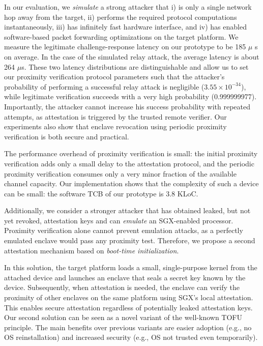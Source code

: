 In our evaluation, we \emph{simulate} a strong attacker that i) is only a single network hop away from the target, ii) performs the required protocol computations instantaneously, iii) has infinitely fast hardware interface, and iv) has enabled software-based packet forwarding optimizations on the target platform. We measure the legitimate challenge-response latency on our prototype to be 185 $\mu$ s on average. In the case of the simulated relay attack, the average latency is about 264 $\mu$s. These two latency distributions are distinguishable and allow us to set our proximity verification protocol parameters such that the attacker's probability of performing a successful relay attack is negligible ($3.55\times 10^{-34}$), while legitimate verification succeeds with a very high probability (0.999999977). Importantly, the attacker cannot increase his success probability with repeated attempts, as attestation is triggered by the trusted remote verifier. Our experiments also show that enclave revocation using periodic proximity verification is both secure and practical.


The performance overhead of proximity verification is small: the initial
proximity verification adds only a small delay to the attestation protocol, and
the periodic proximity verification consumes only a very minor fraction of
the available  channel capacity. Our implementation shows that the complexity of such a device can be small: the software TCB of our prototype is 3.8 KLoC.


 Additionally, we consider a stronger attacker that has obtained leaked, but not yet revoked, attestation keys and can \emph{emulate} an SGX-enabled processor.
%
Proximity verification alone cannot prevent emulation attacks, as a perfectly emulated enclave would pass any proximity test. Therefore, we propose a second attestation mechanism based on \emph{boot-time initialization}. 

In this solution, the target platform loads a small, single-purpose kernel from the attached device and launches an enclave that seals a secret key known by the device. 
Subsequently, when attestation is needed, the enclave can verify the proximity of other enclaves on the same platform using SGX's local attestation. This enables secure attestation regardless of potentially leaked attestation keys. Our second solution can be seen as a novel variant of the well-known TOFU principle. The main benefits over previous variants are easier adoption (e.g., no OS reinstallation) and increased security (e.g., OS not trusted even temporarily).


